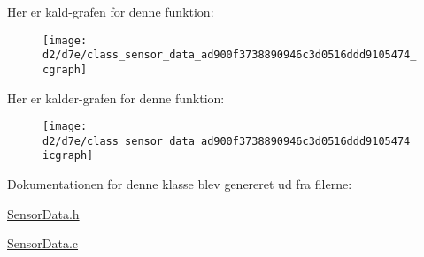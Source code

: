 Her er kald-\/grafen for denne funktion\+:
\nopagebreak
\begin{figure}[H]
\begin{center}
\leavevmode
\texttt{[image: d2/d7e/class\_sensor\_data\_ad900f3738890946c3d0516ddd9105474\_cgraph]}
\end{center}
\end{figure}




Her er kalder-\/grafen for denne funktion\+:
\nopagebreak
\begin{figure}[H]
\begin{center}
\leavevmode
\texttt{[image: d2/d7e/class\_sensor\_data\_ad900f3738890946c3d0516ddd9105474\_icgraph]}
\end{center}
\end{figure}




Dokumentationen for denne klasse blev genereret ud fra filerne\+:\begin{DoxyCompactItemize}
\item 
\hyperlink{_sensor_data_8h}{Sensor\+Data.\+h}\item 
\hyperlink{_sensor_data_8c}{Sensor\+Data.\+c}\end{DoxyCompactItemize}
